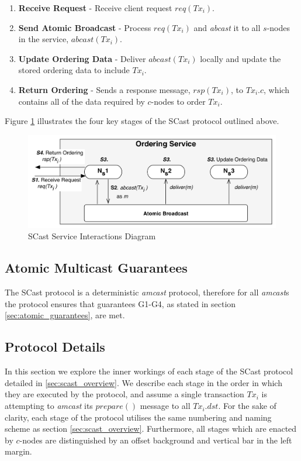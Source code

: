      \begin{enumerate}[label=\bfseries S\arabic*]
        \item    \textbf{Receive Request} - Receive client request $req(Tx_i)$.
        
        \item    \textbf{Send Atomic Broadcast} - Process $req(Tx_i)$ and \emph{abcast} it to all $s$-nodes in the service, $abcast(Tx_i)$.  
        
        \item    \textbf{Update Ordering Data} - Deliver $abcast(Tx_i)$ locally and update the stored ordering data to include $Tx_i$.  
    
        \item    \textbf{Return Ordering} - Sends a response message, $rsp(Tx_i)$, to $Tx_i.c$, which contains all of the data required by $c$-nodes to order $Tx_i$.  
    \end{enumerate}
    
    Figure \ref{fig:scast_service} illustrates the four key stages of the \textsf{SCast} protocol outlined above.  
    
    \begin{figure}[htbp!] 
        \centering    
         \includegraphics[width=1.0\textwidth]{scast_service}
         \caption[SCast Service Interactions]{SCast Service Interactions Diagram}
         \label{fig:scast_service}
    \end{figure}
    
    \subsection{Atomic Multicast Guarantees}
    The \textsf{SCast} protocol is a deterministic \emph{amcast} protocol, therefore for all \emph{amcast}s the protocol ensures that guarantees G1-G4, as stated in section \ref{sec:atomic_guarantees}, are met.      
    
    \subsection{Protocol Details} \label{ssec:scast_details}
    In this section we explore the inner workings of each stage of the \textsf{SCast} protocol detailed in \ref{sec:scast_overview}.  We describe each stage in the order in which they are executed by the protocol, and assume a single transaction $Tx_i$ is attempting to \emph{amcast} its $prepare()$ message to all $Tx_i.dst$.  For the sake of clarity, each stage of the protocol utilises the same numbering and naming scheme as section \ref{sec:scast_overview}. Furthermore, all stages which are enacted by $c$-nodes are distinguished by an offset background and vertical bar in the left margin.  
    
